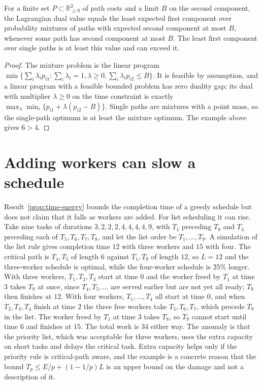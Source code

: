 \begin{newresult}\label{prop:lagrange}
For a finite set $P\subset\mathbb R^2_{\ge0}$ of path costs and a limit $B$ on the second component, the Lagrangian dual value equals the least expected first component over probability mixtures of paths with expected second component at most $B$, whenever some path has second component at most $B$. The least first component over single paths is at least this value and can exceed it.
\end{newresult}
\begin{proof}
The mixture problem is the linear program $\min\{\sum_i\lambda_ip_{i1}:\sum_i\lambda_i=1,\lambda\ge0,\sum_i\lambda_ip_{i2}\le B\}$. It is feasible by assumption, and a linear program with a feasible bounded problem has zero duality gap; its dual with multiplier $\lambda\ge0$ on the time constraint is exactly $\max_\lambda\min_i\{p_{i1}+\lambda(p_{i2}-B)\}$. Single paths are mixtures with a point mass, so the single-path optimum is at least the mixture optimum. The example above gives $6>4$.
\end{proof}

\section{Adding workers can slow a schedule}\label{sec:anomaly}

Result~\ref{prop:time-energy} bounds the completion time of a greedy schedule but does not claim that it falls as workers are added. For list scheduling it can rise. Take nine tasks of durations $3,2,2,2,4,4,4,4,9$, with $T_1$ preceding $T_9$ and $T_4$ preceding each of $T_5,T_6,T_7,T_8$, and let the list order be $T_1,\dots,T_9$. A simulation of the list rule gives completion time $12$ with three workers and $15$ with four. The critical path is $T_4,T_5$ of length $6$ against $T_1,T_9$ of length $12$, so $L=12$ and the three-worker schedule is optimal, while the four-worker schedule is $25\%$ longer. With three workers, $T_1,T_2,T_3$ start at time $0$ and the worker freed by $T_1$ at time $3$ takes $T_9$ at once, since $T_4,T_5,\dots$ are served earlier but are not yet all ready; $T_9$ then finishes at $12$. With four workers, $T_1,\dots,T_4$ all start at time $0$, and when $T_2,T_3,T_4$ finish at time $2$ the three free workers take $T_5,T_6,T_7$, which precede $T_9$ in the list. The worker freed by $T_1$ at time $3$ takes $T_8$, so $T_9$ cannot start until time $6$ and finishes at $15$. The total work is $34$ either way. The anomaly is that the priority list, which was acceptable for three workers, uses the extra capacity on short tasks and delays the critical task. Extra capacity helps only if the priority rule is critical-path aware, and the example is a concrete reason that the bound $T_p\le E/p+(1-1/p)L$ is an upper bound on the damage and not a description of it.

